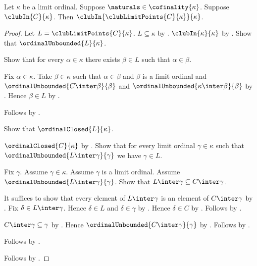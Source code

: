 \begin{theorem}\label{club_limit_points_is_club}
    Let $\kappa$ be a limit ordinal.
    Suppose $\naturals\in\cofinality{\kappa}$.
    Suppose $\clubIn{C}{\kappa}$.
    Then $\clubIn{\clubLimitPoints{C}{\kappa}}{\kappa}$.
\end{theorem}
\begin{proof}
    Let $L=\clubLimitPoints{C}{\kappa}$.
    $L\subseteq\kappa$ by .
    $\clubIn{\kappa}{\kappa}$
        by .
    Show that $\ordinalUnbounded{L}{\kappa}$.
    \begin{subproof}
        Show that for every $\alpha\in\kappa$ there exists $\beta\in L$
            such that $\alpha\in\beta$.
        \begin{subproof}
            Fix $\alpha\in\kappa$.
            Take $\beta\in\kappa$ such that $\alpha\in\beta$ and
                $\beta$ is a limit ordinal and
                $\ordinalUnbounded{C\inter\beta}{\beta}$ and
                $\ordinalUnbounded{\kappa\inter\beta}{\beta}$
                by .
            Hence $\beta\in L$ by .
        \end{subproof}
        Follows by .
    \end{subproof}
    Show that $\ordinalClosed{L}{\kappa}$.
    \begin{subproof}
        $\ordinalClosed{C}{\kappa}$ by .
        Show that for every limit ordinal $\gamma\in\kappa$ such that
            $\ordinalUnbounded{L\inter\gamma}{\gamma}$
            we have $\gamma\in L$.
        \begin{subproof}
            Fix $\gamma$.
            Assume $\gamma\in\kappa$.
            Assume $\gamma$ is a limit ordinal.
            Assume $\ordinalUnbounded{L\inter\gamma}{\gamma}$.
            Show that $L\inter\gamma\subseteq C\inter\gamma$.
            \begin{subproof}
                It suffices to show that every element of $L\inter\gamma$
                    is an element of $C\inter\gamma$ by .
                Fix $\delta\in L\inter\gamma$.
                Hence $\delta\in L$ and $\delta\in\gamma$ by .
                Hence $\delta\in C$
                    by .
                Follows by .
            \end{subproof}
            $C\inter\gamma\subseteq\gamma$ by .
            Hence $\ordinalUnbounded{C\inter\gamma}{\gamma}$
                by .
            Follows by .
        \end{subproof}
        Follows by .
    \end{subproof}
    Follows by .
\end{proof}

